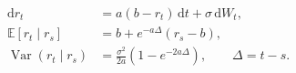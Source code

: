 \documentclass{equation-sheet}
\begin{document}
\begin{equation*}
\begin{aligned}
\mathrm{d}r_t
  &= a(b-r_t)\,\mathrm{d}t + \sigma\,\mathrm{d}W_t, \\[0.55em]
\mathbb{E}[r_t\mid r_s]
  &= b + e^{-a\Delta}(r_s-b), \\[0.55em]
\operatorname{Var}(r_t\mid r_s)
  &= \frac{\sigma^2}{2a}\left(1-e^{-2a\Delta}\right),
  \qquad \Delta=t-s.
\end{aligned}
\end{equation*}
\end{document}
